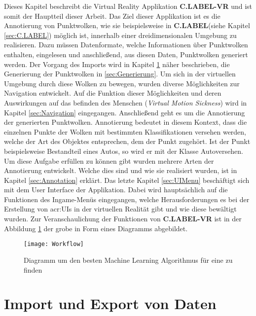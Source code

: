 \graphicspath{{Kapitel/Kapitel4_Hauptteil/Images/}}

Dieses Kapitel beschreibt die Virtual Reality Applikation \textbf{C.LABEL-VR} und ist somit der Hauptteil dieser Arbeit. Das Ziel dieser Applikation ist es die Annotierung von Punktwolken, wie sie beispielsweise in \textbf{C.LABEL}(siehe Kapitel \ref{sec:C.LABEL}) möglich ist, innerhalb einer dreidimensionalen Umgebung zu realisieren. Dazu müssen Datenformate, welche Informationen über Punktwolken enthalten, eingelesen und anschließend, aus diesen Daten, Punktwolken generiert werden. Der Vorgang des Imports wird in Kapitel \ref{sec:ImportExport} näher beschrieben, die Generierung der Punktwolken in \ref{sec:Generierung}. Um sich in der virtuellen Umgebung durch diese Wolken zu bewegen, wurden diverse Möglichkeiten zur Navigation entwickelt. Auf die Funktion dieser Möglichkeiten und deren Auswirkungen auf das befinden des Menschen (\textit{Virtual Motion Sickness}) wird in Kapitel \ref{sec:Navigation} eingegangen. Anschließend geht es um die Annotierung der generierten Punktwolken. Annotierung bedeutet in diesem Kontext, dass die einzelnen Punkte der Wolken mit bestimmten Klassifikationen versehen werden, welche der Art des Objektes entsprechen, dem der Punkt zugehört. Ist der Punkt beispielsweise Bestandteil eines Autos, so wird er mit der Klasse \glqq Auto\grqq versehen. Um diese Aufgabe erfüllen zu können gibt wurden mehrere Arten der Annotierung entwickelt. Welche dies sind und wie sie realisiert wurden, ist in Kapitel \ref{sec:Annotation} erklärt. Das letzte Kapitel \ref{sec:UIMenu} beschäftigt sich mit dem User Interface der Applikation. Dabei wird hauptsächlich auf die Funktionen des Ingame-Menüs eingegangen, welche Herausforderungen es bei der Erstellung von \acrshort{acr:UI}s in der virtuellen Realität gibt und wie diese bewältigt wurden. Zur Veranschaulichung der Funktionen von \textbf{C.LABEL-VR} ist in der Abbildung \ref{fig:Workflow} der grobe  in Form eines Diagramms abgebildet.

\begin{figure}%
	\centering
    \texttt{[image: Workflow]}
    \caption{Diagramm um den besten Machine Learning Algorithmus für eine  zu finden}
    \label{fig:Workflow}
\end{figure}

\section{Import und Export von Daten}
\label{sec:ImportExport}


